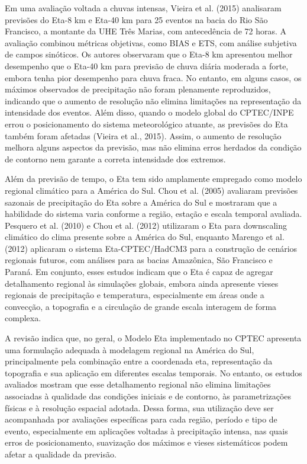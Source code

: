 \documentclass[12pt,a4paper,oneside]{book}
\begin{document}
Em uma avaliação voltada a chuvas intensas, Vieira et al. (2015) analisaram previsões do Eta-8 km e Eta-40 km para 25 eventos na bacia do Rio São Francisco, a montante da UHE Três Marias, com antecedência de 72 horas. A avaliação combinou métricas objetivas, como BIAS e ETS, com análise subjetiva de campos sinóticos. Os autores observaram que o Eta-8 km apresentou melhor desempenho que o Eta-40 km para previsão de chuva diária moderada a forte, embora tenha pior desempenho para chuva fraca. No entanto, em alguns casos, os máximos observados de precipitação não foram plenamente reproduzidos, indicando que o aumento de resolução não elimina limitações na representação da intensidade dos eventos. Além disso, quando o modelo global do CPTEC/INPE errou o posicionamento do sistema meteorológico atuante, as previsões do Eta também foram afetadas (Vieira et al., 2015). Assim, o aumento de resolução melhora alguns aspectos da previsão, mas não elimina erros herdados da condição de contorno nem garante a correta intensidade dos extremos.

Além da previsão de tempo, o Eta tem sido amplamente empregado como modelo regional climático para a América do Sul. Chou et al. (2005) avaliaram previsões sazonais de precipitação do Eta sobre a América do Sul e mostraram que a habilidade do sistema varia conforme a região, estação e escala temporal avaliada. Pesquero et al. (2010) e Chou et al. (2012) utilizaram o Eta para downscaling climático do clima presente sobre a América do Sul, enquanto Marengo et al. (2012) aplicaram o sistema Eta-CPTEC/HadCM3 para a construção de cenários regionais futuros, com análises para as bacias Amazônica, São Francisco e Paraná. Em conjunto, esses estudos indicam que o Eta é capaz de agregar detalhamento regional às simulações globais, embora ainda apresente vieses regionais de precipitação e temperatura, especialmente em áreas onde a convecção, a topografia e a circulação de grande escala interagem de forma complexa.

A revisão indica que, no geral, o Modelo Eta implementado no CPTEC apresenta uma formulação adequada à modelagem regional na América do Sul, principalmente pela combinação entre a coordenada eta, representação da topografia e sua aplicação em diferentes escalas temporais. No entanto, os estudos avaliados mostram que esse detalhamento regional não elimina limitações associadas à qualidade das condições iniciais e de contorno, às parametrizações físicas e à resolução espacial adotada. Dessa forma, sua utilização deve ser acompanhada por avaliações específicas para cada região, período e tipo de evento, especialmente em aplicações voltadas à precipitação intensa, nas quais erros de posicionamento, suavização dos máximos e vieses sistemáticos podem afetar a qualidade da previsão.
\end{document}
